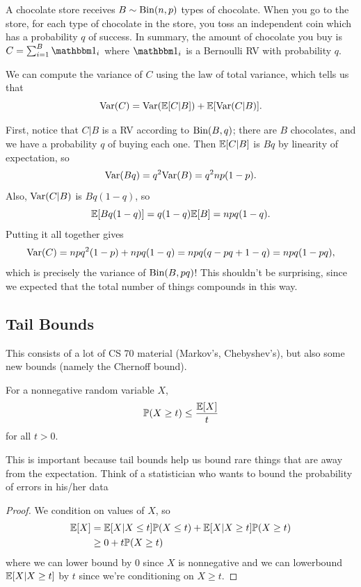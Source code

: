 \documentclass[11 pt]{scrartcl}
\begin{document}
\begin{example}
    A chocolate store receives $B\sim \text{Bin}(n,p)$ types of chocolate. When you go to the store, for each type of chocolate in the store, you toss an independent coin which has a probability $q$ of success. In summary, the amount of chocolate you buy is $C = \sum_{i = 1}^B \one_i$ where $\one_i$ is a Bernoulli RV with probability $q$. 

    We can compute the variance of $C$ using the law of total variance, which tells us that 
    \[ \text{Var}(C) = \text{Var}(\mathbb E[C|B]) + \mathbb E[\text{Var}(C|B)].\] 
    
    First, notice that $C|B$ is a RV according to $\text{Bin}(B, q)$; there are $B$ chocolates, and we have a probability $q$ of buying each one. Then $\mathbb E[C|B]$ is $Bq$ by linearity of expectation, so 
    \[ \text{Var}(Bq) = q^2\text{Var}(B) = q^2np(1-p).\] 
    Also, $\text{Var}(C|B)$ is $Bq(1-q)$, so 
    \[ \mathbb E[Bq(1-q)] = q(1-q)\mathbb E[B] = npq(1-q).\] 
    Putting it all together gives 
    \[ \text{Var}(C) = npq^2(1-p) + npq(1-q) = npq(q-pq + 1-q) = npq(1-pq),\]
    which is precisely the variance of $\text{Bin}(B, pq)$! This shouldn't be surprising, since we expected that the total number of things compounds in this way. 
\end{example}

\subsection{Tail Bounds}
This consists of a lot of CS 70 material (Markov's, Chebyshev's), but also some new bounds (namely the Chernoff bound). 

\begin{theorem}
    For a nonnegative random variable $X$, 
    \[ \mathbb P(X \geq t) \leq \dfrac{\mathbb E[X]}{t}\] 
    for all $t > 0$. 
\end{theorem}

This is important because tail bounds help us bound rare things that are away from the expectation. Think of a statistician who wants to bound the probability of errors in his/her data
\begin{proof}
    We condition on values of $X$, so 
    \begin{align*}
        \mathbb E[X] &= \mathbb E[X | X \leq t] \mathbb P(X\leq t) + \mathbb E[X | X \geq t]\mathbb P(X\geq t) \\ 
               &\geq 0 + t \mathbb P(X\geq t)
    \end{align*}
    where we can lower bound by $0$ since $X$ is nonnegative and we can lowerbound $\mathbb E[X|X\geq t]$ by $t$ since we're conditioning on $X\geq t$. 
\end{proof}
\end{document}
